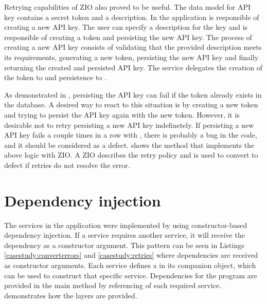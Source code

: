 

Retrying capabilities of ZIO also proved to be useful. The data model for API key contains a secret token and a description. In the application  is responsible of creating a new API key. The user can specify a description for the key and  is responsible of creating a token and persisting the new API key. The process of creating a new API key consists of validating that the provided description meets its requirements, generating a new token, persisting the new API key and finally returning the created and persisted API key. The service delegates the creation of the token to  and persistence to .



As demonstrated in , persisting the API key can fail if the token already exists in the database. A desired way to react to this situation is by creating a new token and trying to persist the API key again with the new token. However, it is desirable not to retry persisting a new API key indefinetely. If persisting a new API key fails a couple times in a row with , there is probably a bug in the code, and it should be considered as a defect.  shows the  method that implements the above logic with ZIO. A ZIO  describes the retry policy and  is used to convert  to defect if retries do not resolve the error.


\section{Dependency injection}
The services in the application were implemented by using constructor-based dependency injection. If a service requires another service, it will receive the dependency as a constructor argument. This pattern can be seen in Listings \ref{casestudy:converterrors} and \ref{casestudy:retries} where dependencies are received as constructor arguments. Each service defines a  in its companion object, which can be used to construct that specific service. Dependencies for the program are provided in the main method by referencing  of each required service.  demonstrates how the layers are provided.

